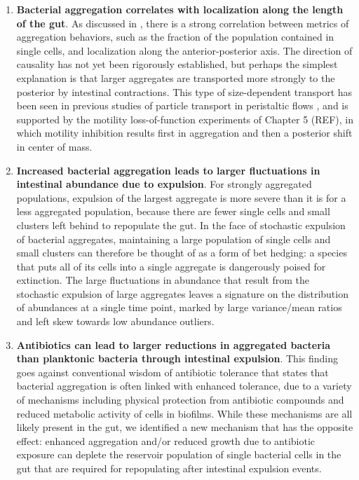 \begin{enumerate}
\item 
\textbf{Bacterial aggregation correlates with localization along the length of the gut}. As discussed in \cite{schlomann_bacterial_2018}, there is a strong correlation between metrics of aggregation behaviors, such as the fraction of the population contained in single cells, and localization along the anterior-posterior axis. The direction of causality has not yet been rigorously established, but perhaps the simplest explanation is that larger aggregates are transported more strongly to the posterior by intestinal contractions. This type of size-dependent transport has been seen in previous studies of particle transport in peristaltic flows \cite{Jimenez-Lozano2009}, and is supported by the motility loss-of-function experiments of Chapter 5 (REF), in which motility inhibition results first in aggregation and then a posterior shift in center of mass.

\item 
\textbf{Increased bacterial aggregation leads to larger fluctuations in intestinal abundance due to expulsion}. For strongly aggregated populations, expulsion of the largest aggregate is more severe than it is for a less aggregated population, because there are fewer single cells and small clusters left behind to repopulate the gut. In the face of stochastic expulsion of bacterial aggregates, maintaining a large population of single cells and small clusters can therefore be thought of as a form of bet hedging: a species that puts all of its cells into a single aggregate is dangerously poised for extinction. The large fluctuations in abundance that result from the stochastic expulsion of large aggregates leaves a signature on the distribution of abundances at a single time point, marked by large variance/mean ratios and left skew towards low abundance outliers.

\item 
\textbf{Antibiotics can lead to larger reductions in aggregated bacteria than planktonic bacteria through intestinal expulsion}. This finding goes against conventional wisdom of antibiotic tolerance that states that bacterial aggregation is often linked with enhanced tolerance, due to a variety of mechanisms including physical protection from antibiotic compounds and reduced metabolic activity of cells in biofilms. While these mechanisms are all likely present in the gut, we identified a new mechanism that has the opposite effect: enhanced aggregation and/or reduced growth due to antibiotic exposure can deplete the reservoir population of single bacterial cells in the gut that are required for repopulating after intestinal expulsion events.


\end{enumerate}
